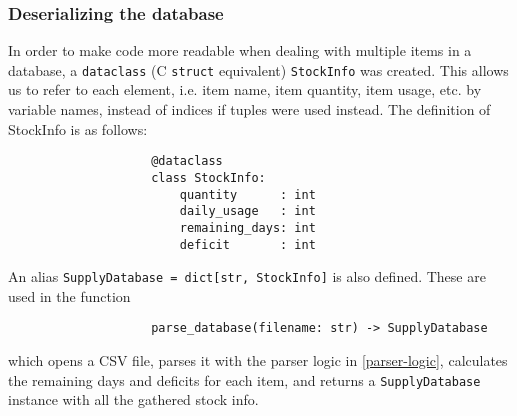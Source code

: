 \documentclass{article}
\begin{document}
			\subsubsection{Deserializing the database}
				In order to make code more readable when dealing with multiple items in a database, a
				\verb|dataclass| (C \verb|struct| equivalent) \verb|StockInfo| was created. This allows us
				to refer to each element, i.e. item name, item quantity, item usage, etc. by variable names,
				instead of indices if tuples were used instead. The definition of StockInfo is as follows:

				\begin{verbatim}
					@dataclass
					class StockInfo:
						quantity      : int
						daily_usage   : int
						remaining_days: int
						deficit       : int
				\end{verbatim}

				An alias \verb|SupplyDatabase = dict[str, StockInfo]| is also defined. These are used in the
				function

				\begin{verbatim}
					parse_database(filename: str) -> SupplyDatabase
				\end{verbatim}

				which opens a CSV file, parses it with the parser logic in \ref{parser-logic}, calculates
				the remaining days and deficits for each item, and returns a \verb|SupplyDatabase| instance
				with all the gathered stock info.
\end{document}
